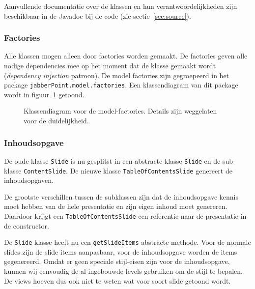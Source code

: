 \documentclass[a4paper]{article}
\newcommand{\code}[1]{\lstinline[columns=fixed]{#1}}
\newcommand{\diagram}[3][1.3]{
	\begin{figure}[!htb]
	 \caption{#3}
	 \label{diagram:#2}
	 \makebox[\textwidth][c]{\texttt{[image: Diagrams/\#2.pdf]}}%
	\end{figure}
}
\begin{document}
		Aanvullende documentatie over de klassen en hun verantwoordelijkheden zijn beschikbaar in de Javadoc bij de code (zie sectie~\ref{sec:source}).
		
		\subsubsection{Factories}\label{sec:model-factories}
			Alle klassen mogen alleen door factories worden gemaakt.
			De factories geven alle nodige dependencies mee op het moment dat de klasse gemaakt wordt (\textit{dependency injection} patroon).
			De model factories zijn gegroepeerd in het package \code{jabberPoint.model.factories}.
			Een klassendiagram van dit package wordt in figuur~\ref{diagram:model-factories} getoond.

			\diagram{model-factories}{
				Klassendiagram voor de model-factories.
				Details zijn weggelaten voor de duidelijkheid.
			}

		\subsubsection{Inhoudsopgave}
			De oude klasse \code{Slide} is nu gesplitst in een abstracte klasse \code{Slide} en de sub-klasse \code{ContentSlide}.
			De nieuwe klasse \code{TableOfContentsSlide} genereert de inhoudsopgaven.

			De grootste verschillen tussen de subklassen zijn dat de inhoudsopgave kennis moet hebben van de hele presentatie en zijn eigen inhoud moet genereren.
			Daardoor krijgt een \code{TableOfContentsSlide} een referentie naar de presentatie in de constructor.

			De \code{Slide} klasse heeft nu een \code{getSlideItems} abstracte methode.
			Voor de normale slides zijn de slide items aanpasbaar, voor de inhoudsopgave worden de items gegenereerd.
			Omdat er geen speciale stijl-eisen zijn voor de inhoudsopgave, kunnen wij eenvoudig de al ingebouwde levels gebruiken om de stijl te bepalen.
			De views hoeven dus ook niet te weten wat voor soort slide getoond wordt.
\end{document}
